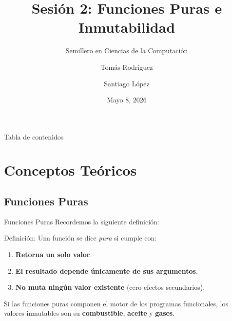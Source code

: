 \documentclass{beamer}
\title{Sesión 2:  Funciones Puras e Inmutabilidad}
\subtitle{Semillero en Ciencias de la Computación}
\author[Rodríguez, López]{Tomás Rodríguez \and Santiago López}
\date{Mayo 8, 2026}
\begin{document}
\frame{\titlepage}

\begin{frame}{Tabla de contenidos}
    \tableofcontents
\end{frame}

\section{Conceptos Teóricos}

\subsection{Funciones Puras}
\begin{frame}{Funciones Puras}
    Recordemos la siguiente definición:
    \begin{block}{Definición:}
        Una función se dice \textit{pura} si cumple con:
    \begin{enumerate}
        \item \textbf{Retorna un solo valor}.
        \item \textbf{El resultado depende únicamente de sus argumentos}.
        \item \textbf{No muta ningún valor existente} (cero efectos secundarios).
    \end{enumerate}
    
    \end{block}
    
    
    \vspace{0.5cm}
    
        Si las funciones puras componen el motor de los programas funcionales, los valores inmutables son su \textbf{combustible}, \textbf{aceite} y \textbf{gases}.
    
\end{frame}
\end{document}
